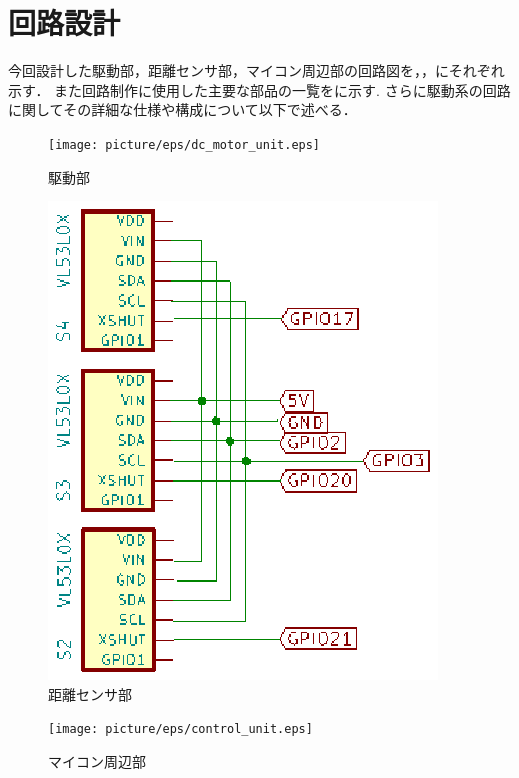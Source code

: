 \section{回路設計}
今回設計した駆動部，距離センサ部，マイコン周辺部の回路図を，，にそれぞれ示す．
また回路制作に使用した主要な部品の一覧をに示す.
さらに駆動系の回路に関してその詳細な仕様や構成について以下で述べる．

\begin{figure}[h]
\centering
\texttt{[image: picture/eps/dc\_motor\_unit.eps]}
\caption{駆動部}
\label{fig::dc_motor_unit}
\end{figure}


\begin{figure}[b]
\centering
\includegraphics[scale=1]{picture/eps/sensor_unit.eps}
\caption{距離センサ部}
\label{fig::sensor_unit}
\end{figure}


\begin{figure}[h]
\centering
\texttt{[image: picture/eps/control\_unit.eps]}
\caption{マイコン周辺部}
\label{fig::control_unit}
\end{figure}

\clearpage


